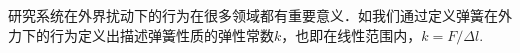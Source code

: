 
\begin{issues}
\issueTODO
\end{issues}

研究系统在外界扰动下的行为在很多领域都有重要意义．如我们通过定义弹簧在外力下的行为定义出描述弹簧性质的弹性常数$k$，也即在线性范围内，$k=F/\Delta l$.
